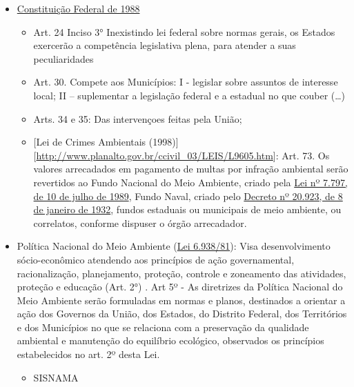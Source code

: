 \documentclass[
]{article}
\providecommand{\tightlist}{%
  \setlength{\itemsep}{0pt}\setlength{\parskip}{0pt}}
\begin{document}
\begin{itemize}
\item
  \href{https://www.planalto.gov.br/ccivil_03/Constituicao/Constituicao.htm}{Constituição
  Federal de 1988}

  \begin{itemize}
  \tightlist
  \item
    Art. 24 Inciso 3° Inexistindo lei federal sobre normas gerais, os
    Estados exercerão a competência legislativa plena, para atender a
    suas peculiaridades
  \item
    Art. 30. Compete aos Municípios: I - legislar sobre assuntos de
    interesse local; II -- suplementar a legislação federal e a estadual
    no que couber (\ldots)
  \item
    Arts. 34 e 35: Das intervençoes feitas pela União;
  \item
    {[}Lei de Crimes Ambientais
    (1998){]}{[}\url{http://www.planalto.gov.br/ccivil_03/LEIS/L9605.htm}{]}:
    Art. 73. Os valores arrecadados em pagamento de multas por infração
    ambiental serão revertidos ao Fundo Nacional do Meio Ambiente,
    criado pela
    \href{http://www.planalto.gov.br/ccivil_03/LEIS/L7797.htm}{Lei nº
    7.797, de 10 de julho de 1989}, Fundo Naval, criado pelo
    \href{https://legislacao.planalto.gov.br/legisla/legislacao.nsf/viwTodos/04737B762935FE7A032569FA0045A2E0?OpenDocument\&HIGHLIGHT=1,}{Decreto
    nº 20.923, de 8 de janeiro de 1932}, fundos estaduais ou municipais
    de meio ambiente, ou correlatos, conforme dispuser o órgão
    arrecadador.
  \end{itemize}
\item
  Política Nacional do Meio Ambiente
  (\href{https://www.planalto.gov.br/ccivil_03/LEIS/L6938.htm}{Lei
  6.938/81}): Visa desenvolvimento sócio-econômico atendendo aos
  princípios de ação governamental, racionalização, planejamento,
  proteção, controle e zoneamento das atividades, proteção e educação
  (Art. 2°) . Art 5º - As diretrizes da Política Nacional do Meio
  Ambiente serão formuladas em normas e planos, destinados a orientar a
  ação dos Governos da União, dos Estados, do Distrito Federal, dos
  Territórios e dos Municípios no que se relaciona com a preservação da
  qualidade ambiental e manutenção do equilíbrio ecológico, observados
  os princípios estabelecidos no art. 2º desta Lei.

  \begin{itemize}
  \item
    SISNAMA


\end{itemize}
\end{itemize}
\end{document}
